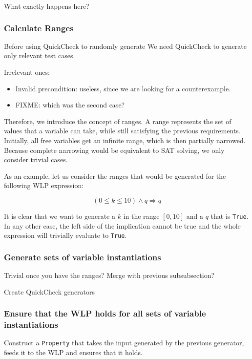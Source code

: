 \documentclass[a4paper]{article}
\begin{document}
What exactly happens here?

\subsubsection*{Calculate Ranges}

Before using QuickCheck to randomly generate
We need QuickCheck to generate only relevant test cases.

Irrelevant ones:

\begin{itemize}
\item Invalid precondition: useless, since we are looking for a counterexample.
\item FIXME: which was the second case?
\end{itemize}

Therefore, we introduce the concept of ranges. A range represents the set of
values that a variable can take, while still satisfying the previous requirements.
Initially, all free variables get an infinite range, which is then partially narrowed.
Because complete narrowing would be equivalent to SAT solving, we only consider
trivial cases.

As an example, let us consider the ranges that would be generated for the following WLP
expression:

\[ (0 \leq k \leq 10) \land q \Rightarrow q \]

It is clear that we want to generate a $k$ in the range $[0, 10]$ and a $q$
that is \texttt{True}. In any other case, the left side of the implication cannot
be true and the whole expression will trivially evaluate to \texttt{True}.

\subsubsection*{Generate sets of variable instantiations}

Trivial once you have the ranges? Merge with previous subsubsection?

Create QuickCheck generators

\subsubsection*{Ensure that the WLP holds for all sets of variable instantiations}

Construct a \texttt{Property} that takes the input generated by the previous
generator, feeds it to the WLP and ensures that it holds.
\end{document}
